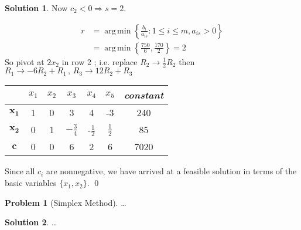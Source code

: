 \documentclass[11pt]{article}
\theoremstyle{plain}
\theoremstyle{definition}
\newtheorem{prob}{Problem}
\newtheorem*{soln*}{Solution}
\numberwithin{equation}{section}
\DeclareMathOperator*{\argmin}{arg\,min}
\begin{document}
\begin{soln*}
Now $c_2 < 0  \Rightarrow s = 2$.

\begin{align*}
    r &= \argmin \left\{ \frac{b_i}{a_{is}} : 1 \le i \le m , a_{is} > 0 \right\}\\
      &= \argmin \left\{ \frac{750}{6} , \frac{170}{2} \right\} = 2
\end{align*}
So pivot at $2x_2$ in row 2 ; i.e. replace $R_2 \to \frac{1}{2} R_2$ then
$R_1 \to -6R_2 + R_1 \,,\, R_3 \to 12R_2 + R_3 $

\begin{center}
\begin{tabu}{c|c|c|c|c|c|c}
    ~ & $x_1$ & $x_2$ & $x_3$ & $x_4$ & $x_5$ & \textit{constant} \\
    \hline
    $\bm{x_1}$ & 1 & 0 & 3 & 4 & -3 & 240 \\
    $\bm{x_2}$ & 0 & 1 & $-\frac{3}{4}$ & -$\frac{1}{2}$ & $\frac{1}{2}$ & 85 \\
    $\bm{c}$   & 0 & 0 & 6 & 2 & 6 & 7020
\end{tabu}
\end{center}
Since all $c_i$ are nonnegative, we have arrived at a feasible solution in terms of the basic variables
$\{x_1,x_2\}$.
\qed
\end{soln*}
\hrulefill

\begin{prob}[Simplex Method]
    \dots
\end{prob}

\begin{soln*}
    \dots
\end{soln*}

\hrulefill
\end{document}
